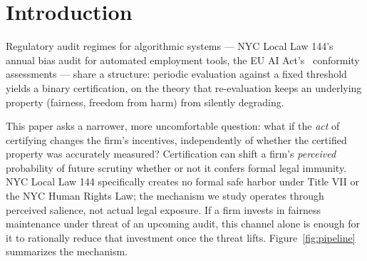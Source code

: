 \section{Introduction}

Regulatory audit regimes for algorithmic systems — NYC Local Law 144's~\cite{nyc2021ll144} annual bias audit for automated employment tools, the EU AI Act's~\cite{euaiact2024} conformity assessments — share a structure: periodic evaluation against a fixed threshold yields a binary certification, on the theory that re-evaluation keeps an underlying property (fairness, freedom from harm) from silently degrading.

This paper asks a narrower, more uncomfortable question: what if the \emph{act} of certifying changes the firm's incentives, independently of whether the certified property was accurately measured? Certification can shift a firm's \emph{perceived} probability of future scrutiny whether or not it confers formal legal immunity. NYC Local Law 144 specifically creates no formal safe harbor under Title VII or the NYC Human Rights Law; the mechanism we study operates through perceived salience, not actual legal exposure. If a firm invests in fairness maintenance under threat of an upcoming audit, this channel alone is enough for it to rationally reduce that investment once the threat lifts. Figure~\ref{fig:pipeline} summarizes the mechanism.

